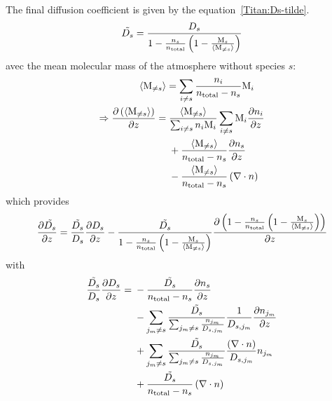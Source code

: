 The final diffusion coefficient is given by the equation~\ref{Titan:Ds-tilde}.
\begin{equation}
\tilde{D_s} = \frac{D_s}{1-\frac{n_s}{n_\text{total}}\left(1 - \frac{\text{M}_s}{\langle\text{M}_{\neq s}\rangle}\right)}
\label{Titan:Ds-tilde}
\end{equation}
avec  the mean molecular mass of the atmosphere without
species $s$:
\begin{equation}
\begin{split}
\langle\text{M}_{\neq s}\rangle & = \sum_{i\neq s} \frac{n_i}{n_\text{total} - n_s}\text{M}_i\\
\Rightarrow \frac{\partial\left(\langle\text{M}_{\neq s}\rangle\right)}{\partial z} = 
        &\;   \frac{\langle\text{M}_{\neq s}\rangle}{\sum_{i\neq s}n_i\text{M}_i} \sum_{i\neq s} \text{M}_i\frac{\partial n_i}{\partial z} \\
        &\;  + \frac{\langle\text{M}_{\neq s}\rangle}{n_\text{total} - n_s} \frac{\partial n_s}{\partial z} \\
        &\;  - \frac{\langle\text{M}_{\neq s}\rangle}{n_\text{total} - n_s} \left(\nabla\cdot{\ensuremath{n}}\right)
\end{split}
\end{equation}
which provides
\begin{equation}
\frac{\partial\tilde{D_s}}{\partial z}  = \frac{\tilde{D_s}}{D_s}\frac{\partial D_s}{\partial z}
                             - \frac{\tilde{D_s}}{1-\frac{n_s}{n_\text{total}}\left(1 - \frac{\text{M}_s}{\langle\text{M}_{\neq s}\rangle}\right)}
                                \frac{\partial\left(1-\frac{n_s}{n_\text{total}}\left(1 - \frac{\text{M}_s}{\langle\text{M}_{\neq s}\rangle}\right)\right)}{\partial z}
\end{equation}
with
\begin{equation}
\begin{split}
\frac{\tilde{D_s}}{D_s}\frac{\partial D_s}{\partial z}
                  = &\; - \frac{\tilde{D_s}}{n_\text{total} - n_s}\frac{\partial n_s}{\partial z} \\
                    &\; - \sum_{j_m\neq s}\frac{\tilde{D_s}}{\sum_{j_m \neq s}\frac{n_{j_m}}{D_{s,j_m}}}
                                \frac{1}{D_{s,j_m}} \frac{\partial n_{j_m}}{\partial z} \\
                    &\; +  \sum_{j_m\neq s}\frac{\tilde{D_s}}{\sum_{j_m \neq s}\frac{n_{j_m}}{D_{s,j_m}}} 
                                \frac{\left(\nabla\cdot{\ensuremath{n}}\right)}{D_{s,j_m}}n_{j_m} \\
                    &\; + \frac{\tilde{D_s}}{n_\text{total} - n_s}\left(\nabla\cdot{\ensuremath{n}}\right) \\
\end{split}
\end{equation}

